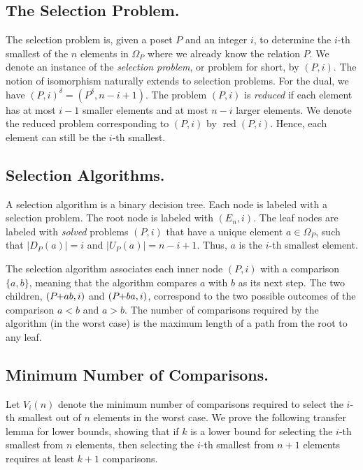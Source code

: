 \documentclass[a4paper,UKenglish,cleveref, autoref, thm-restate]{lipics-v2021}
\newcommand{\pchild}[3]{{#1}\kern-1pt{+}{#2}{#3}}
\newcommand{\dual}[1]{{#1}^{\delta}}
\newcommand{\reduced}[1]{\operatorname{red}{#1}}
\newcommand{\less}[2]{D_{#1}(#2)}
\newcommand{\greater}[2]{U_{#1}(#2)}
\begin{document}
\subsection{The Selection Problem.}
The selection problem is, given a poset $P$ and an integer $i$, to determine the $i$-th smallest of the $n$ elements in $\Omega_P$ where we already know the relation $P$.
We denote an instance of the \emph{selection problem}, or problem for short, by $(P, i)$.
The notion of isomorphism naturally extends to selection problems.
For the dual, we have $\dual{(P, i)} = (\dual{P}, n - i + 1)$.
The problem $(P, i)$ is \emph{reduced} if each element has at most $i - 1$ smaller elements and at most $n - i$ larger elements.
We denote the reduced problem corresponding to $(P, i)$ by $\reduced{(P, i)}$.
Hence, each element can still be the $i$-th smallest.

\subsection{Selection Algorithms.}
A selection algorithm is a binary decision tree.
Each node is labeled with a selection problem.
The root node is labeled with $(E_n, i)$.
The leaf nodes are labeled with \emph{solved} problems $(P, i)$ that have a unique element $a \in \Omega_P$, such that $|\less{P}{a}| = i$ and $|\greater{P}{a}| = n - i + 1$.
Thus, $a$ is the $i$-th smallest element.

The selection algorithm associates each inner node $(P, i)$ with a comparison $\{a, b\}$, meaning that the algorithm compares $a$ with $b$ as its next step.
The two children, $(\pchild{P}{a}{b}, i)$ and $(\pchild{P}{b}{a}, i)$, correspond to the two possible outcomes of the comparison $a < b$ and $a > b$.
The number of comparisons required by the algorithm (in the worst case) is the maximum length of a path from the root to any leaf.


\subsection{Minimum Number of Comparisons.}

Let $V_i(n)$ denote the minimum number of comparisons required to select the $i$-th smallest out of $n$ elements in the worst case.
We prove the following transfer lemma for lower bounds, showing that if $k$ is a lower bound for selecting the $i$-th smallest from $n$ elements, then selecting the $i$-th smallest from $n + 1$ elements requires at least $k + 1$ comparisons.
\end{document}
